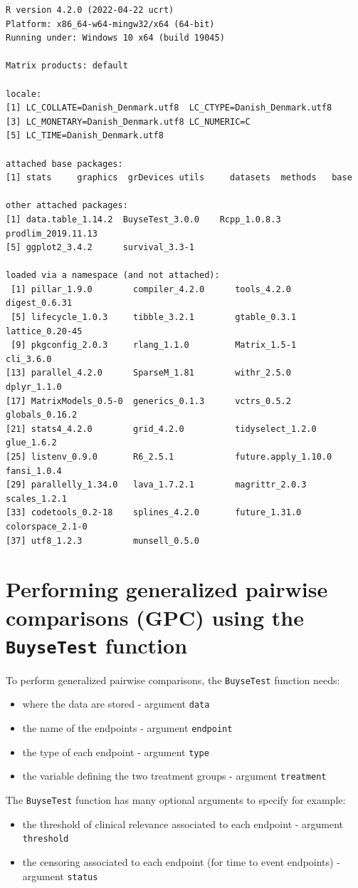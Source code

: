 \documentclass[12pt]{article}
\begin{document}
\begin{verbatim}
R version 4.2.0 (2022-04-22 ucrt)
Platform: x86_64-w64-mingw32/x64 (64-bit)
Running under: Windows 10 x64 (build 19045)

Matrix products: default

locale:
[1] LC_COLLATE=Danish_Denmark.utf8  LC_CTYPE=Danish_Denmark.utf8   
[3] LC_MONETARY=Danish_Denmark.utf8 LC_NUMERIC=C                   
[5] LC_TIME=Danish_Denmark.utf8    

attached base packages:
[1] stats     graphics  grDevices utils     datasets  methods   base     

other attached packages:
[1] data.table_1.14.2  BuyseTest_3.0.0    Rcpp_1.0.8.3       prodlim_2019.11.13
[5] ggplot2_3.4.2      survival_3.3-1    

loaded via a namespace (and not attached):
 [1] pillar_1.9.0        compiler_4.2.0      tools_4.2.0         digest_0.6.31      
 [5] lifecycle_1.0.3     tibble_3.2.1        gtable_0.3.1        lattice_0.20-45    
 [9] pkgconfig_2.0.3     rlang_1.1.0         Matrix_1.5-1        cli_3.6.0          
[13] parallel_4.2.0      SparseM_1.81        withr_2.5.0         dplyr_1.1.0        
[17] MatrixModels_0.5-0  generics_0.1.3      vctrs_0.5.2         globals_0.16.2     
[21] stats4_4.2.0        grid_4.2.0          tidyselect_1.2.0    glue_1.6.2         
[25] listenv_0.9.0       R6_2.5.1            future.apply_1.10.0 fansi_1.0.4        
[29] parallelly_1.34.0   lava_1.7.2.1        magrittr_2.0.3      scales_1.2.1       
[33] codetools_0.2-18    splines_4.2.0       future_1.31.0       colorspace_2.1-0   
[37] utf8_1.2.3          munsell_0.5.0
\end{verbatim}

\clearpage

\section{Performing generalized pairwise comparisons (GPC) using the \texttt{BuyseTest} function}
\label{sec:org6608846}

To perform generalized pairwise comparisons, the \texttt{BuyseTest} function needs:
\begin{itemize}
\item where the data are stored \hfill - argument \texttt{data}
\item the name of the endpoints \hfill - argument \texttt{endpoint}
\item the type of each endpoint \hfill - argument \texttt{type}
\item the variable defining the two treatment groups \hfill - argument
\texttt{treatment}
\end{itemize}
The \texttt{BuyseTest} function has many optional arguments to specify for example:
\begin{itemize}
\item the threshold of clinical relevance associated to each endpoint \hfill - argument \texttt{threshold}
\item the censoring associated to each endpoint (for time to event endpoints) \hfill - argument \texttt{status}
\end{itemize}
\end{document}
